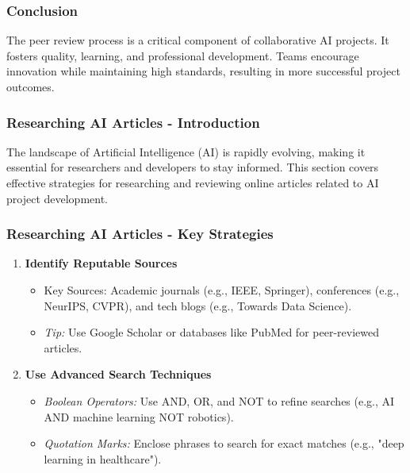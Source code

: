 \documentclass{beamer}
\begin{document}
\begin{frame}[fragile]
    \frametitle{Conclusion}
    The peer review process is a critical component of collaborative AI projects. It fosters quality, learning, and professional development. Teams encourage innovation while maintaining high standards, resulting in more successful project outcomes.
\end{frame}

\begin{frame}[fragile]
    \frametitle{Researching AI Articles - Introduction}
    The landscape of Artificial Intelligence (AI) is rapidly evolving, making it essential for researchers and developers to stay informed. 
    This section covers effective strategies for researching and reviewing online articles related to AI project development.
\end{frame}

\begin{frame}[fragile]
    \frametitle{Researching AI Articles - Key Strategies}
    \begin{enumerate}
        \item \textbf{Identify Reputable Sources}
        \begin{itemize}
            \item Key Sources: Academic journals (e.g., IEEE, Springer), conferences (e.g., NeurIPS, CVPR), and tech blogs (e.g., Towards Data Science).
            \item \textit{Tip:} Use Google Scholar or databases like PubMed for peer-reviewed articles.
        \end{itemize}
        
        \item \textbf{Use Advanced Search Techniques}
        \begin{itemize}
            \item \textit{Boolean Operators:} Use AND, OR, and NOT to refine searches (e.g., AI AND machine learning NOT robotics).
            \item \textit{Quotation Marks:} Enclose phrases to search for exact matches (e.g., "deep learning in healthcare").
        \end{itemize}
    \end{enumerate}
\end{frame}
\end{document}
